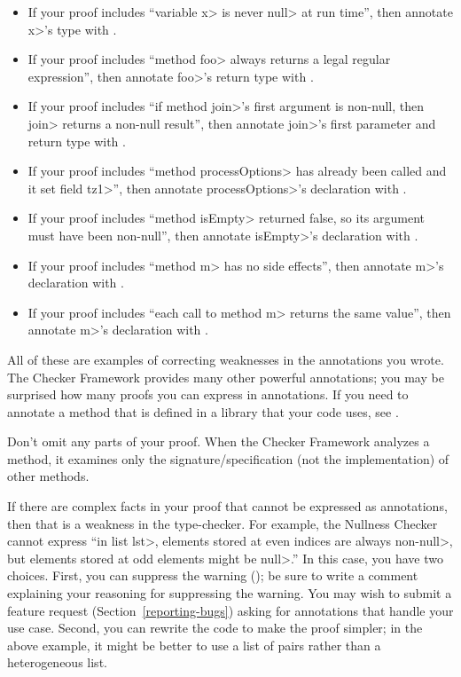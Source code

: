 \begin{itemize}
\item
  If your proof includes ``variable \<x> is never \<null>
  at run time'', then annotate \<x>'s type with
  .
\item
  If your proof
  includes ``method \<foo> always returns a legal regular expression'',
  then annotate \<foo>'s return type with
  .
\item
  If your proof includes ``if method \<join>'s first argument is
  non-null, then \<join> returns a non-null result'', then annotate
  \<join>'s first parameter and return type with
  .
\item
  If your proof includes ``method \<processOptions> has already been called and it
  set field \<tz1>'', then annotate \<processOptions>'s declaration with
  .
\item
  If your proof includes ``method \<isEmpty> returned false, so its
  argument must have been non-null'', then annotate \<isEmpty>'s
  declaration with
  .
\item
  If your proof includes ``method \<m> has no side effects'',
  then annotate \<m>'s declaration with
  .
\item
  If your proof includes ``each call to method \<m> returns the same value'',
  then annotate \<m>'s declaration with
  .
\end{itemize}

All of these are examples of correcting weaknesses in the annotations you wrote.
The Checker Framework provides many other powerful annotations; you may
be surprised how many proofs you can express in annotations.
If you need to annotate a method that is defined in a
library that your code uses, see .

Don't omit any parts of your proof.  When the Checker Framework analyzes
a method, it examines only the signature/specification (not the implementation)
of other methods.

If there are complex facts in your proof that cannot be expressed as
annotations, then that is a weakness in the type-checker.  For example,
the Nullness Checker cannot express ``in list \<lst>, elements stored at
even indices are always non-\<null>, but elements stored at odd elements
might be \<null>.''  In this case, you have two choices.
%
First, you can suppress the warning
(); be sure to write a comment
explaining your reasoning for suppressing the warning.  You may wish to
submit a feature request (Section~\ref{reporting-bugs}) asking for
annotations that handle your use case.
%
Second, you can rewrite the code to make the proof simpler;
in the above example, it might be better to use a list of pairs
rather than a heterogeneous list.

